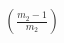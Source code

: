 \documentclass[preview]{standalone}
\begin{document}
\begin{align*}
\left(\frac{m_2 - 1}{m_2}\right)
\end{align*}
\end{document}
